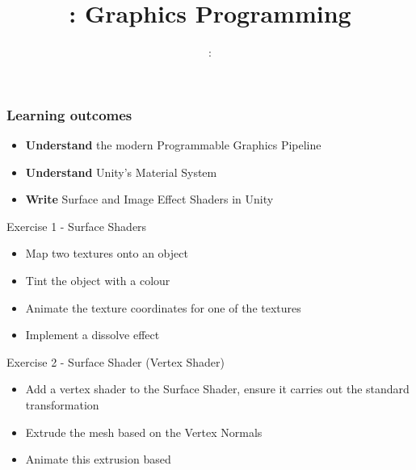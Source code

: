 \usepackage{../../beamerthemeFalmouthGamesAcademy}
\usepackage{multimedia}
\graphicspath{ {../../} }

\usepackage[normalem]{ulem}
\usepackage{wasysym}

\usepackage{pdfpages}



\usetikzlibrary{arrows,automata}




\title{\sessionnumber: Graphics Programming}
\subtitle{\modulecode: \moduletitle}

\frame{\titlepage} 

\begin{frame}
	\frametitle{Learning outcomes}
	\begin{itemize}
		\item \textbf{Understand} the modern Programmable Graphics Pipeline
		\item \textbf{Understand} Unity's Material System
		\item \textbf{Write} Surface and Image Effect Shaders in Unity
	\end{itemize}
\end{frame}






\begin{frame}{Exercise 1 - Surface Shaders}
	\begin{itemize}
		\item Map two textures onto an object
		\item Tint the object with a colour
		\item Animate the texture coordinates for one of the textures
		\item Implement a dissolve effect
	\end{itemize}
\end{frame}

\begin{frame}{Exercise 2 - Surface Shader (Vertex Shader)}
	\begin{itemize}
		\item Add a vertex shader to the Surface Shader, ensure it carries out the standard transformation
		\item Extrude the mesh based on the Vertex Normals
		\item Animate this extrusion based
	\end{itemize}
\end{frame}

